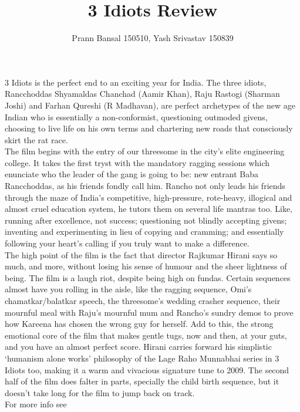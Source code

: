 \documentclass{article}
\title{3 Idiots Review}
\author{Prann Bansal 150510, Yash Srivastav 150839}
\begin{document}
\maketitle

3 Idiots is the perfect end to an exciting year for India. The three idiots, Rancchoddas Shyamaldas Chanchad (Aamir Khan), Raju Rastogi (Sharman Joshi) and Farhan Qureshi (R Madhavan), are perfect archetypes of the new age Indian who is essentially a non-conformist, questioning outmoded givens, choosing to live life on his own terms and chartering new roads that consciously skirt the rat race.\\
 The film begins with the entry of our threesome in the city's elite engineering college. It takes the first tryst with the mandatory ragging sessions which enunciate who the leader of the gang is going to be: new entrant Baba Rancchoddas, as his friends fondly call him. Rancho not only leads his friends through the maze of India's competitive, high-pressure, rote-heavy, illogical and almost cruel education system, he tutors them on several life mantras too. Like, running after excellence, not success; questioning not blindly accepting givens; inventing and experimenting in lieu of copying and cramming; and essentially following your heart's calling if you truly want to make a difference.\\
The high point of the film is the fact that director Rajkumar Hirani says so much, and more, without losing his sense of humour and the sheer lightness of being. The film is a laugh riot, despite being high on fundas. Certain sequences almost have you rolling in the aisle, like the ragging sequence, Omi's chamatkar/balatkar speech, the threesome's wedding crasher sequence, their mournful meal with Raju's mournful mum and Rancho's sundry demos to prove how Kareena has chosen the wrong guy for herself. Add to this, the strong emotional core of the film that makes gentle tugs, now and then, at your guts, and you have an almost perfect score. Hirani carries forward his simplistic `humanism alone works' philosophy of the Lage Raho Munnabhai series in 3 Idiots too, making it a warm and vivacious signature tune to 2009. The second half of the film does falter in parts, specially the child birth sequence, but it doesn't take long for the film to jump back on track.\\

For more info see \cite{indiatimes-article}


\end{document}
